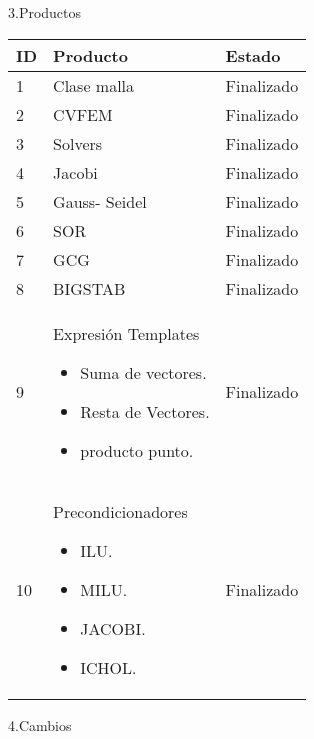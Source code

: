 \documentclass[12pt]{report}
\numberwithin{equation}{section}
\begin{document}
\begin{flushleft}
\large{3.Productos }
\begin{table}[H]
\begin{tabular}{|m{0.5cm}|m{7.5cm}|m{6cm}|}
\hline 
\textbf{ID } & \textbf{Producto} & \textbf{Estado} \\
\hline
\hline
 1 & \small{Clase malla} & \small{Finalizado}\\
\hline
 2 & \small{CVFEM} & \small{Finalizado}\\
\hline
 3 & \small{Solvers} & \small{Finalizado}\\
\hline
 4 & \small{Jacobi} & \small{Finalizado}\\
\hline
 5 & \small{Gauss- Seidel} & \small{Finalizado}\\
\hline
 6 & \small{SOR} & \small{Finalizado}\\
\hline
 7 & \small{GCG} & \small{Finalizado}\\
\hline
 8 & \small{BIGSTAB} & \small{Finalizado}\\
\hline
 9 & \small{Expresión Templates \begin{itemize}
 \item Suma de vectores.
 \item Resta de Vectores.
 \item producto punto.
 \end{itemize}} & \small{Finalizado}\\
\hline
10 & \small{Precondicionadores \begin{itemize}
\item ILU.
\item MILU.
\item JACOBI.
\item ICHOL.
\end{itemize}} & \small{Finalizado}\\
\hline
\end{tabular}
\label{tabla: TABLA CE Productos}
\end{table}


\large{4.Cambios}\\


\end{flushleft}
\end{document}

